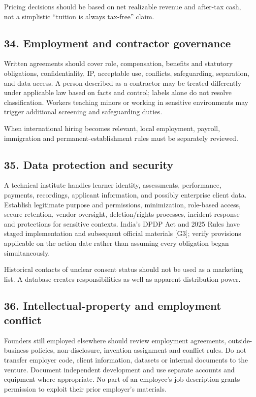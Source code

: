 Pricing decisions should be based on net realizable revenue and after-tax cash, not a simplistic ``tuition is always tax-free'' claim.

\subsection{34. Employment and contractor governance}

Written agreements should cover role, compensation, benefits and statutory obligations, confidentiality, IP, acceptable use, conflicts, safeguarding, separation, and data access. A person described as a contractor may be treated differently under applicable law based on facts and control; labels alone do not resolve classification. Workers teaching minors or working in sensitive environments may trigger additional screening and safeguarding duties.

When international hiring becomes relevant, local employment, payroll, immigration and permanent-establishment rules must be separately reviewed.

\subsection{35. Data protection and security}

A technical institute handles learner identity, assessments, performance, payments, recordings, applicant information, and possibly enterprise client data. Establish legitimate purpose and permissions, minimization, role-based access, secure retention, vendor oversight, deletion/rights processes, incident response and protections for sensitive contexts. India's DPDP Act and 2025 Rules have staged implementation and subsequent official materials [G3]; verify provisions applicable on the action date rather than assuming every obligation began simultaneously.

Historical contacts of unclear consent status should not be used as a marketing list. A database creates responsibilities as well as apparent distribution power.

\subsection{36. Intellectual-property and employment conflict}

Founders still employed elsewhere should review employment agreements, outside-business policies, non-disclosure, invention assignment and conflict rules. Do not transfer employer code, client information, datasets or internal documents to the venture. Document independent development and use separate accounts and equipment where appropriate. No part of an employee's job description grants permission to exploit their prior employer's materials.

